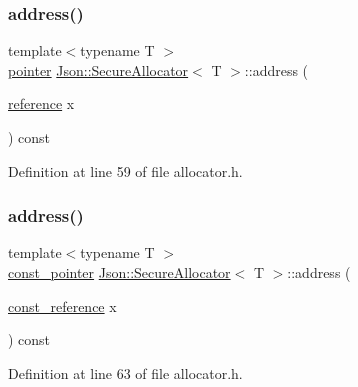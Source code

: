 \subsubsection{\texorpdfstring{address()}{address()}\hspace{0.1cm}{\footnotesize\ttfamily [1/2]}}
{\footnotesize\ttfamily template$<$typename T $>$ \\
\hyperlink{class_json_1_1_secure_allocator_a442c09b3267622d23416d9072ea1afe9}{pointer} \hyperlink{class_json_1_1_secure_allocator}{Json\+::\+Secure\+Allocator}$<$ T $>$\+::address (\begin{DoxyParamCaption}\item[{\hyperlink{class_json_1_1_secure_allocator_a55b243c56812b3852b59c1a9b0a21c65}{reference}}]{x }\end{DoxyParamCaption}) const\hspace{0.3cm}{\ttfamily [inline]}}



Definition at line 59 of file allocator.\+h.

\hypertarget{class_json_1_1_secure_allocator_a228944048dd7266f219b52fd1958b4d5}{}\label{class_json_1_1_secure_allocator_a228944048dd7266f219b52fd1958b4d5} 
\subsubsection{\texorpdfstring{address()}{address()}\hspace{0.1cm}{\footnotesize\ttfamily [2/2]}}
{\footnotesize\ttfamily template$<$typename T $>$ \\
\hyperlink{class_json_1_1_secure_allocator_a464b356817c78ea996cd3a7403f7e735}{const\+\_\+pointer} \hyperlink{class_json_1_1_secure_allocator}{Json\+::\+Secure\+Allocator}$<$ T $>$\+::address (\begin{DoxyParamCaption}\item[{\hyperlink{class_json_1_1_secure_allocator_a3f0327d609dcd1942c8c7fa4d4f227e5}{const\+\_\+reference}}]{x }\end{DoxyParamCaption}) const\hspace{0.3cm}{\ttfamily [inline]}}



Definition at line 63 of file allocator.\+h.

\hypertarget{class_json_1_1_secure_allocator_a9b7d7180b360ebd673bdcfab25c1d5a4}{}\label{class_json_1_1_secure_allocator_a9b7d7180b360ebd673bdcfab25c1d5a4} 
